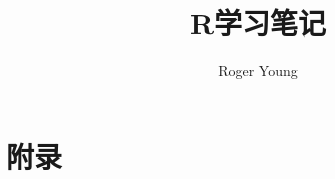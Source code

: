 \documentclass{ctexbook}
\newcommand{\documentTitle}
    {\texorpdfstring{R学习笔记}{R学习笔记}}
\newcommand{\documentAuthor}{Roger Young}
\begin{document}
\title{\documentTitle}
\author{\documentAuthor}

\maketitle
\tableofcontents






\part{附录}


\printindex
\printglossaries
\end{document}
